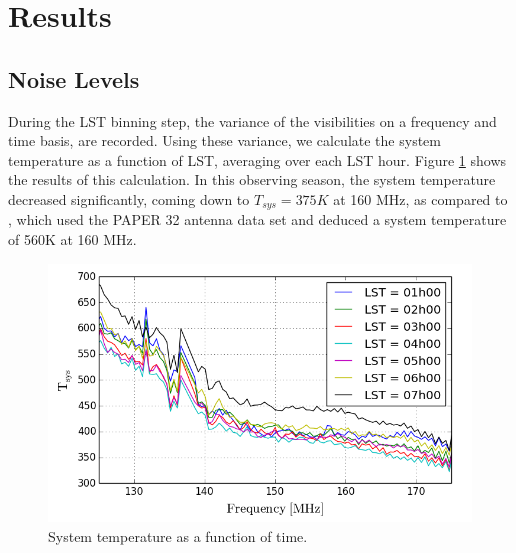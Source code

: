 \documentclass[twocolumn,numberedappendix]{emulateapj} \shorttitle{PSA64}
\begin{document}
%




\section{Results}

\subsection{Noise Levels}   
During the LST binning step, the variance of the visibilities on a frequency and
time basis, are recorded. Using these variance, we calculate the system
temperature as a function of LST, averaging over each LST hour. Figure
\ref{fig:tsys} shows the results of this calculation. In this observing season,
the system temperature decreased significantly, coming down to $T_{sys} = 375K$
at 160 MHz, as compared to \cite{parsons_et_al2014a,jacobs_et_al2014a}, which
used the PAPER 32 antenna data set and deduced a system temperature of 560K at
160 MHz.

\begin{figure}[h!]\centering
\includegraphics[width=\columnwidth]{plots/tsys.png}
\caption{System temperature as a function of time.}
\label{fig:tsys}
\end{figure}
\end{document}
